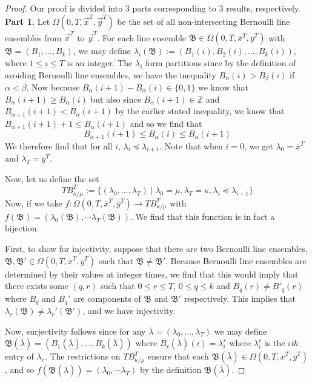 \begin{proof} Our proof is divided into $3$ parts corresponding to $3$ results, respectively.\\
\textbf{Part 1. }Let $\Omega(0,T,\vec{x}^T, \vec{y}^T)$ be the set of all non-intersecting Bernoulli line ensembles from $\vec{x}^T$ to $\vec{y}^T$. For each line ensemble $\mathfrak{B}\in \Omega(0,T,\bar x^T,\bar y^T)$ with $\mathfrak B=(B_1,...,B_k)$, we may define $\lambda_i(\mathfrak B):=(B_1(i),B_2(i),...,B_k(i))$, where $1 \leqslant i\leqslant T$ is an integer. The $\lambda_i$ form partitions since by the definition of avoiding Bernoulli line ensembles, we have the inequality $B_\alpha(i)>B_\beta(i)$ if $\alpha<\beta$. 
Now because $B_\alpha(i+1)-B_\alpha(i)\in \{0,1\}$ we know that $B_\alpha(i+1)\geq B_\alpha(i)$ but also since $B_\alpha(i+1)\in \mathbb{Z}$ and $B_{\alpha+1}(i+1)<B_\alpha(i+1)$ by the earlier stated inequality, we know that $B_{\alpha+1}(i+1)+1\leq B_\alpha(i+1)$ and so we find that 
\[B_{\alpha+1}(i+1)\leq B_\alpha(i)\leq B_\alpha(i+1)\]
We therefore find that for all $i$, $\lambda_i\preceq \lambda_{i+1}$. Note that when $i=0$, we get $\lambda_0=\bar x^T$ and $\lambda_T=\bar y^T$.

Now, let us define the set 
\[TB_{\kappa/\mu}^T:=\{(\lambda_0,...,\lambda_T)\mid \lambda_0=\mu, \lambda_T=\kappa, \lambda_i\preceq\lambda_{i+1}\}\] 
Now, if we take $f:\Omega(0,T,\bar x^T, \bar y ^T)\to TB_{\kappa/\mu}^T$ with $f(\mathfrak{B})= (\lambda_0(\mathfrak{B}),\cdots \lambda_T(\mathfrak{B}))$. We find that this function is in fact a bijection. 

First, to show for injectivity, suppose that there are two Bernoulli line ensembles, $\mathfrak{B}, \mathfrak{B}'\in \Omega(0,T,\bar x^T, \bar y ^T)$ such that $\mathfrak{B}\neq \mathfrak{B'}$.
Because Bernoulli line ensembles are determined by their values at integer times, we find that this would imply that there exists some $(q,r)$ such that $0\leq r\leq T$, $0\leq q \leq k$ and $B_q(r)\neq B'_q(r)$ where $B_q$ and $B_q'$ are components of $\mathfrak{B}$ and $\mathfrak{B'}$ respectively. 
This implies that $\lambda_r(\mathfrak B)\neq \lambda_r'(\mathfrak{B'})$, and we have injectivity. 

Now, surjectivity follows since for any $\bar\lambda=(\lambda_0,...,\lambda_T)$ we may define $\mathfrak{B}(\bar{\lambda})=(B_1(\bar\lambda),...,B_k(\bar\lambda))$ where $B_r(\bar\lambda)(i)=\lambda_i^r$ where $\lambda_i^r$ is the $i$\textit{th} entry of $\lambda_r$. The restrictions on $TB_{\kappa/\mu}^T$ ensure that each $\mathfrak{B}(\bar\lambda)\in \Omega(0,T,\bar x^T,\bar y^T)$, and so $f(\mathfrak B(\bar{\lambda}))=(\lambda_0,\cdots \lambda_T)$ by the definition $\mathfrak{B}(\bar\lambda)$. 


\end{proof}
